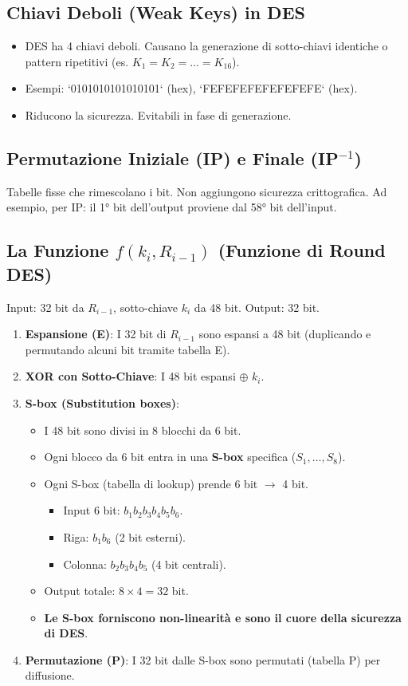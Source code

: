 \subsection{Chiavi Deboli (Weak Keys) in DES}
\begin{itemize}
    \item DES ha 4 chiavi deboli. Causano la generazione di sotto-chiavi identiche o pattern ripetitivi (es. $K_1 = K_2 = \dots = K_{16}$).
    \item Esempi: `0101010101010101` (hex), `FEFEFEFEFEFEFEFE` (hex).
    \item Riducono la sicurezza. Evitabili in fase di generazione.
\end{itemize}

\subsection{Permutazione Iniziale (IP) e Finale (IP$^{-1}$)}
Tabelle fisse che rimescolano i bit. Non aggiungono sicurezza crittografica.
Ad esempio, per IP: il 1° bit dell'output proviene dal 58° bit dell'input.

\subsection{La Funzione $f(k_i, R_{i-1})$ (Funzione di Round DES)}
Input: 32 bit da $R_{i-1}$, sotto-chiave $k_i$ da 48 bit. Output: 32 bit.
\begin{enumerate}
    \item \textbf{Espansione (E)}: I 32 bit di $R_{i-1}$ sono espansi a 48 bit (duplicando e permutando alcuni bit tramite tabella E).
    \item \textbf{XOR con Sotto-Chiave}: I 48 bit espansi $\oplus$ $k_i$.
    \item \textbf{S-box (Substitution boxes)}:
    \begin{itemize}
        \item I 48 bit sono divisi in 8 blocchi da 6 bit.
        \item Ogni blocco da 6 bit entra in una \textbf{S-box} specifica ($S_1, \dots, S_8$).
        \item Ogni S-box (tabella di lookup) prende 6 bit $\rightarrow$ 4 bit.
        \begin{itemize}
            \item Input 6 bit: $b_1 b_2 b_3 b_4 b_5 b_6$.
            \item Riga: $b_1 b_6$ (2 bit esterni).
            \item Colonna: $b_2 b_3 b_4 b_5$ (4 bit centrali).
        \end{itemize}
        \item Output totale: $8 \times 4 = 32$ bit.
        \item \textbf{Le S-box forniscono non-linearità e sono il cuore della sicurezza di DES}.
    \end{itemize}
    \item \textbf{Permutazione (P)}: I 32 bit dalle S-box sono permutati (tabella P) per diffusione.
\end{enumerate}

